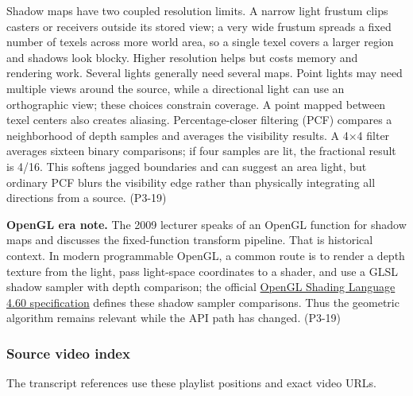 Shadow maps have two coupled resolution limits. A narrow light frustum clips casters or receivers outside its stored view; a very wide frustum spreads a fixed number of texels across more world area, so a single texel covers a larger region and shadows look blocky. Higher resolution helps but costs memory and rendering work. Several lights generally need several maps. Point lights may need multiple views around the source, while a directional light can use an orthographic view; these choices constrain coverage. A point mapped between texel centers also creates aliasing. Percentage-closer filtering (PCF) compares a neighborhood of depth samples and averages the visibility results. A 4×4 filter averages sixteen binary comparisons; if four samples are lit, the fractional result is 4/16. This softens jagged boundaries and can suggest an area light, but ordinary PCF blurs the visibility edge rather than physically integrating all directions from a source. (P3-19)

\textbf{OpenGL era note.} The 2009 lecturer speaks of an OpenGL function for shadow maps and discusses the fixed-function transform pipeline. That is historical context. In modern programmable OpenGL, a common route is to render a depth texture from the light, pass light-space coordinates to a shader, and use a GLSL shadow sampler with depth comparison; the official \href{https://registry.khronos.org/OpenGL/specs/gl/GLSLangSpec.4.60.pdf}{OpenGL Shading Language 4.60 specification} defines these shadow sampler comparisons. Thus the geometric algorithm remains relevant while the API path has changed. (P3-19)

\subsubsection{Source video index}\label{03-visual-computing-i-ch011-source-video-index}

The transcript references use these playlist positions and exact video URLs.

